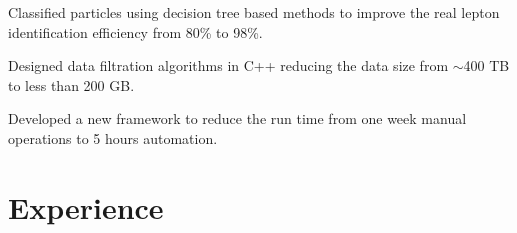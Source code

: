 \documentclass[letterpaper]{deedy-resume-openfont}
\begin{document}
\location{}
\begin{tightemize}
\item Classified particles using decision tree based methods to improve the real lepton identification efficiency from 80\% to 98\%.
\item Designed data filtration algorithms in C++ reducing the data size from $\sim$400 TB to less than 200 GB.%
\item Developed a new framework to reduce the run time from one week manual operations to 5 hours automation.
\end{tightemize}
\sectionsep


\section{Experience}

\end{document}
